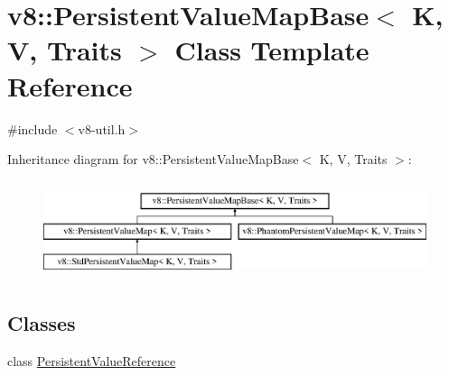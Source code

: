 \hypertarget{classv8_1_1_persistent_value_map_base}{}\section{v8\+:\+:Persistent\+Value\+Map\+Base$<$ K, V, Traits $>$ Class Template Reference}
\label{classv8_1_1_persistent_value_map_base}


{\ttfamily \#include $<$v8-\/util.\+h$>$}

Inheritance diagram for v8\+:\+:Persistent\+Value\+Map\+Base$<$ K, V, Traits $>$\+:\begin{figure}[H]
\begin{center}
\leavevmode
\includegraphics[height=2.886598cm]{classv8_1_1_persistent_value_map_base}
\end{center}
\end{figure}
\subsection*{Classes}
\begin{DoxyCompactItemize}
\item 
class \hyperlink{classv8_1_1_persistent_value_map_base_1_1_persistent_value_reference}{Persistent\+Value\+Reference}
\end{DoxyCompactItemize}
